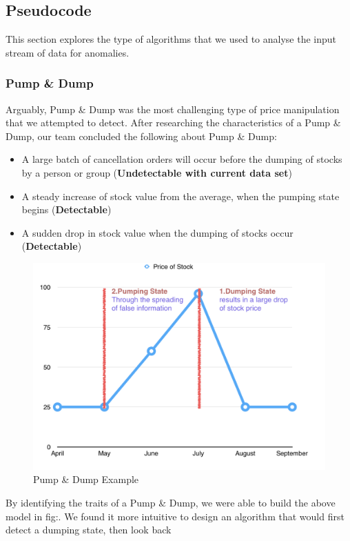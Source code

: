 \documentclass[12pt]{article}
\begin{document}
  \subsection{Pseudocode}
    This section explores the type of algorithms that we used to analyse the input stream of data for anomalies.
    \subsubsection{Pump \& Dump}
    Arguably, Pump \& Dump was the most challenging type of price manipulation that we attempted to detect.
    After researching the characteristics of a Pump \& Dump, our team concluded the following about Pump \& Dump:
    \begin{itemize}
      \item A large batch of cancellation orders will occur before the dumping of stocks by a person or group (\textbf{Undetectable with current data set})
      \item A steady increase of stock value from the average, when the pumping state begins (\textbf{Detectable})
      \item A sudden drop in stock value when the dumping of stocks occur (\textbf{Detectable})
    \end{itemize}
    \begin{figure}[H]
    \centering
    \includegraphics[width=130mm]{PumpDumpGraph.png}
    \caption{Pump \& Dump Example}
    \end{figure}
    By identifying the traits of a Pump \& Dump, we were able to build the above model in fig:.
    We found it more intuitive to design an algorithm that would first detect a dumping state, then look back
\end{document}
